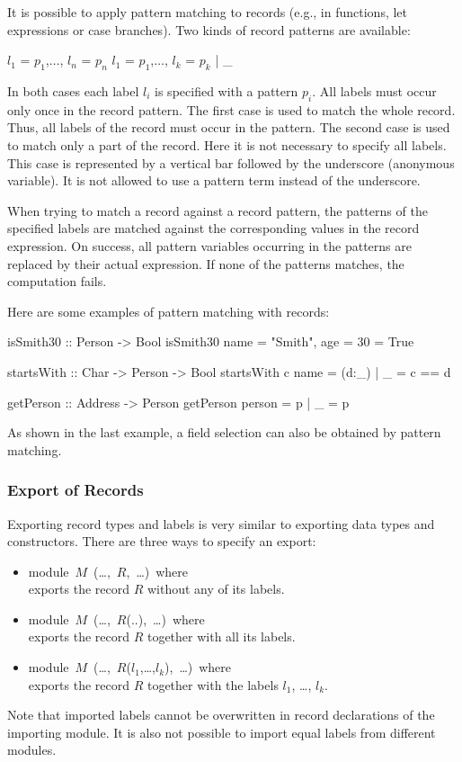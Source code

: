 \documentclass[11pt,fleqn]{article}
\renewcommand{\tt}{\usefont{OT1}{cmtt}{m}{n}\selectfont}
\newcommand{\codefont}{\tt}
\newcommand{\code}[1]{\mbox{\codefont #1}}
\begin{document}
It is possible to apply pattern matching to records (e.g., in functions,
let expressions or case branches). Two kinds of record patterns
are available:
\begin{curry}
{$l_1$ = $p_1$,$\ldots$, $l_n$ = $p_n$}
{$l_1$ = $p_1$,$\ldots$, $l_k$ = $p_k$ | _}
\end{curry}
In both cases each label $l_i$ is specified with a pattern $p_i$. 
All labels must occur only once in the record pattern.
The first case is used to match the whole record. Thus, all labels
of the record must occur in the pattern. 
The second case is used to match only a part of
the record. Here it is not necessary to specify all labels.
This case is represented by a vertical bar followed by the underscore
(anonymous variable). It is
not allowed to use a pattern term instead of the underscore.


When trying to match a record against a record pattern, the 
patterns of the specified labels are matched against 
the corresponding values in the record expression. On success, all pattern
variables occurring in the patterns are replaced by their actual expression.
If none of the patterns matches, the computation fails.


Here are some examples of pattern matching with records:
\begin{curry}
isSmith30 :: Person -> Bool
isSmith30 {name = "Smith", age = 30} = True
\end{curry}
\begin{curry}
startsWith :: Char -> Person -> Bool
startsWith c {name = (d:_) | _} = c == d
\end{curry}
\begin{curry}
getPerson :: Address -> Person
getPerson {person = p | _} = p
\end{curry}
As shown in the last example, a field selection can also be obtained
by pattern matching.


\subsubsection{Export of Records}
\label{sec-exprecs}

Exporting record types and labels is very similar to exporting
data types and constructors. There are three ways 
to specify an export:
\begin{itemize}
\item \code{module $M$ (\ldots, $R$, \ldots) where} \\
  exports the record $R$ without any of its labels.
\item \code{module $M$ (\ldots, $R$(..), \ldots) where} \\
  exports the record $R$ together with all its labels.
\item \code{module $M$ (\ldots, $R$($l_1$,\ldots,$l_k$), \ldots) where} \\
  exports the record $R$ together with the labels $l_1$, \ldots, $l_k$.
\end{itemize}
%
Note that imported labels cannot be overwritten in record declarations
of the importing module. It is also not possible to import equal labels
from different modules.
\end{document}

